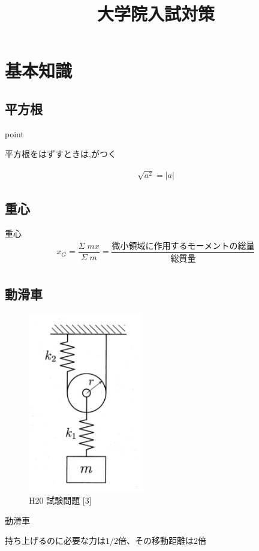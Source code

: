 \documentclass[a4paper]{jsarticle}
\author{}
\title{大学院入試対策}
\date{}
\begin{document}
\maketitle

\section{基本知識}
\subsection{平方根}
\begin{itembox}[l]{point}
    \begin{center}
        平方根をはずすときは,がつく
    \end{center}
\end{itembox}
\begin{eqnarray*}
    \sqrt{a^2}=|a|
\end{eqnarray*}
\subsection{重心}
\begin{itembox}[l]{重心}
    \begin{eqnarray*}
        x_G=\dfrac{\Sigma\; mx}{\Sigma\; m}=\dfrac{微小領域に作用するモーメントの総量}{総質量}\\
    \end{eqnarray*}
\end{itembox}
\subsection{動滑車}
\begin{figure}[htbp]
    \begin{center}
        \includegraphics[width=50mm]{images/kiriki_image1.jpg}
        \caption{H20 試験問題 [3]}
    \end{center}
\end{figure}
\begin{itembox}[l]{動滑車}
    \begin{center}
        持ち上げるのに必要な力は$1/2$倍、その移動距離は$2$倍
    \end{center}
\end{itembox}
\end{document}
